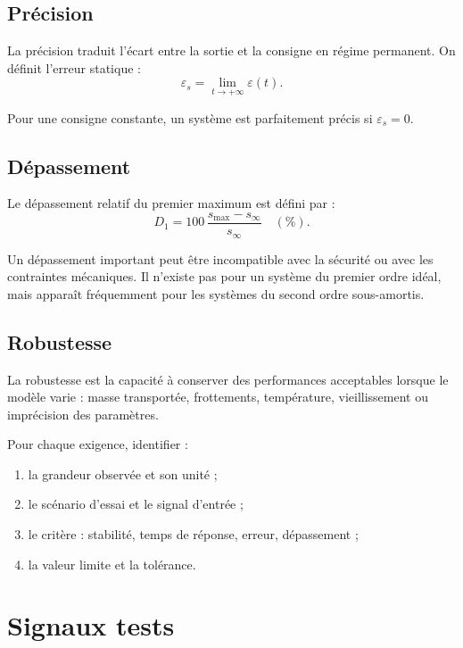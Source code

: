 \subsection{Précision}

La précision traduit l'écart entre la sortie et la consigne en régime permanent. On définit l'erreur statique :
\[
\varepsilon_s=\lim_{t\to+\infty}\varepsilon(t).
\]

Pour une consigne constante, un système est parfaitement précis si $\varepsilon_s=0$.

\subsection{Dépassement}

Le dépassement relatif du premier maximum est défini par :
\[
D_1=100\,\frac{s_{\max}-s_\infty}{s_\infty}\quad(\%).
\]

Un dépassement important peut être incompatible avec la sécurité ou avec les contraintes mécaniques. Il n'existe pas pour un système du premier ordre idéal, mais apparaît fréquemment pour les systèmes du second ordre sous-amortis.

\subsection{Robustesse}

La robustesse est la capacité à conserver des performances acceptables lorsque le modèle varie : masse transportée, frottements, température, vieillissement ou imprécision des paramètres.

\begin{SAmethode}[title={Lecture d'un cahier des charges}]
Pour chaque exigence, identifier :
\begin{enumerate}
  \item la grandeur observée et son unité ;
  \item le scénario d'essai et le signal d'entrée ;
  \item le critère : stabilité, temps de réponse, erreur, dépassement ;
  \item la valeur limite et la tolérance.
\end{enumerate}
\end{SAmethode}

\section{Signaux tests}\label{sec:sa-signaux-tests}

